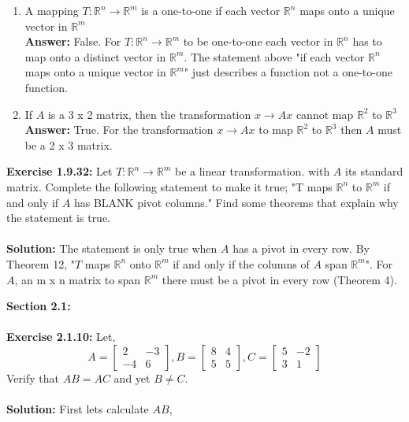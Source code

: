 \documentclass{amsart}
\def\RR{{\mathbb R}}
\begin{document}
\begin{enumerate}
\item A mapping $T: \RR^{n} \to \RR^{m}$ is a one-to-one if each vector $\RR^{n}$ maps onto a unique vector in $\RR^{m}$ \\
\textbf{Answer: }False. For $T: \RR^{n} \to \RR^{m}$ to be one-to-one each vector in $\RR^{n}$ has to map onto a distinct vector in $\RR^{m}$. The statement above  "if each vector $\RR^{n}$ maps onto a unique vector in $\RR^{m}$" just describes a function not a one-to-one function. 
\vspace{1in}



\item If $A$ is a 3 x 2 matrix, then the transformation $x \to Ax$ cannot map $\RR^{2}$ to $\RR^{3}$\\
\textbf{Answer: } True. For the transformation $x \to Ax$ to map $\RR^{2}$ to $\RR^{3}$ then $A$ must be a 2 x 3 matrix. 
\vspace{1in}
\end{enumerate}




\noindent\textbf{Exercise 1.9.32: } Let $T: \RR^{n} \to \RR^{m}$ be a linear transformation. with $A$ its standard matrix. Complete the following statement to make it true; "T maps $\RR^{n}$ to $\RR^{m}$ if and only if $A$ has BLANK pivot columns." Find some theorems that explain why the statement is true.\\\\
 \textbf{Solution: } The statement is only true when $A$ has a pivot in every row. By Theorem 12, "$T$ maps $\RR^{n}$ onto $\RR^{m}$ if and only if the columns of $A$ span $\RR^{m}$". For $A$, an m x n matrix to span $\RR^{m}$ there must be a pivot in every row (Theorem 4).
\vspace{1in}





{\huge\textbf{Section 2.1:}}\\\\
\noindent\textbf{Exercise 2.1.10: } Let,
\begin{equation}
A=
\begin{bmatrix}
2&-3\\
-4&6
\end{bmatrix},
B=
\begin{bmatrix}
8&4\\
5&5
\end{bmatrix},
C=
\begin{bmatrix}
5&-2\\
3&1
\end{bmatrix}
\end{equation}
Verify that $AB=AC$ and yet $B \neq C$.\\\\
\noindent \textbf{Solution: } First lets calculate $AB$,
\end{document}
